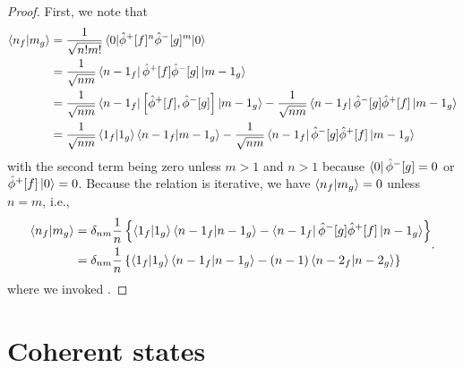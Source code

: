 \qkgnumberinnerproduct
\begin{proof}
	First, we note that
	\begin{equation*}
		\begin{split}
			\braket{n_f}{m_g}
			&=
			\frac{1}{\sqrt{n!m!}}
			\expval{\hat\phi^+[f]^n\hat\phi^-[g]^m}{0}
			\\
			&=
			\frac{1}{\sqrt{nm}}
			\bra{n-1_f}
			\hat\phi^+[f]
			\hat\phi^-[g]
			\ket{m-1_g}
			\\
			&=
			\frac{1}{\sqrt{nm}}
			\bra{n-1_f}
			\comm{\hat\phi^+[f]}{\hat\phi^-[g]}
			\ket{m-1_g}
			-
			\frac{1}{\sqrt{nm}}
			\bra{n-1_f}
			\hat\phi^-[g]
			\hat\phi^+[f]
			\ket{m-1_g}
			\\
			&=
			\frac{1}{\sqrt{nm}}
			\braket{1_f}{1_g}
			\braket{n-1_f}{m-1_g}
			-
			\frac{1}{\sqrt{nm}}
			\bra{n-1_f}
			\hat\phi^-[g]
			\hat\phi^+[f]
			\ket{m-1_g}
		\end{split}
	\end{equation*}
	with the second term being zero unless $m>1$ and $n>1$ because $\bra{0}\hat\phi^-[g]=0$ or $\hat\phi^+[f]\ket{0}=0$.
	Because the relation is iterative, we have $\braket{n_f}{m_g}=0$ unless $n=m$, i.e.,
	\begin{equation*}
		\begin{split}
			\braket{n_f}{m_g}
			&=
			\delta_{nm}
			\frac{1}{n}
			\left\{
				\braket{1_f}{1_g}
				\braket{n-1_f}{n-1_g}
				-
				\bra{n-1_f}
				\hat\phi^-[g]
				\hat\phi^+[f]
				\ket{n-1_g}
			\right\}
			\\
			&=
			\delta_{nm}
			\frac{1}{n}
			\left\{
				\braket{1_f}{1_g}
				\braket{n-1_f}{n-1_g}
				-
				(n-1)
				\bra{n-2_f}
				\ket{n-2_g}
			\right\}
		\end{split}
		.
	\end{equation*}
	where we invoked .
\end{proof}

\section{Coherent states}